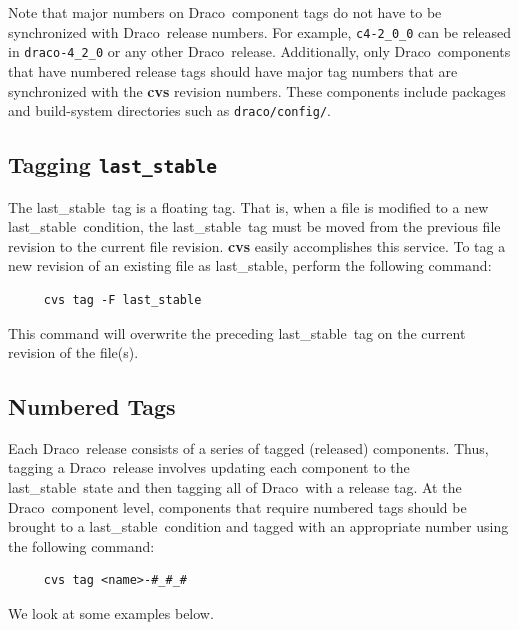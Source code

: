 \documentclass[11pt]{nmemo}
\newcommand{\draco}{{\normalfont\normalsize\sffamily Draco}}
\newcommand{\stable}{{\normalfont\normalsize\ttfamily last\_stable}}
\begin{document}
Note that major numbers on \draco\ component tags do not have to be
synchronized with \draco\ release numbers.  For example,
\texttt{c4-2\_0\_0} can be released in \texttt{draco-4\_2\_0} or any
other \draco\ release.  Additionally, only \draco\ components that
have numbered release tags should have major tag numbers that are
synchronized with the {\bf cvs} revision numbers.  These components
include packages and build-system directories such as
\texttt{draco/config/}.

\subsection{Tagging \texttt{last\_stable}}

The \stable\ tag is a floating tag.  That is, when a file is modified
to a new \stable\ condition, the \stable\ tag must be moved from the
previous file revision to the current file revision.  {\bf cvs} easily 
accomplishes this service.  To tag a new revision of an existing file
as \stable, perform the following command:
\begin{verbatim}
     cvs tag -F last_stable
\end{verbatim}
This command will overwrite the preceding \stable\ tag on the current
revision of the file(s).

\subsection{Numbered Tags}

Each \draco\ release consists of a series of tagged (released)
components.  Thus, tagging a \draco\ release involves updating each
component to the \stable\ state and then tagging all of \draco\ with a
release tag.  At the \draco\ component level, components that require
numbered tags should be brought to a \stable\ condition and tagged
with an appropriate number using the following command:
\begin{verbatim}
     cvs tag <name>-#_#_#
\end{verbatim}
We look at some examples below.
\end{document}
